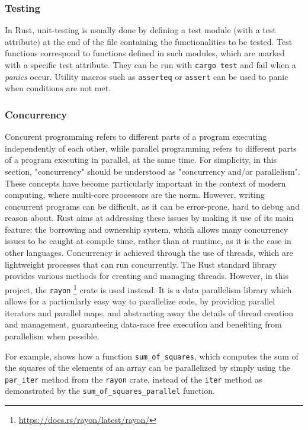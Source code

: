\subsubsection{Testing}

In Rust, unit-testing is usually done by defining a test module (with a test attribute) at the end of the file containing the functionalities to be
tested. Test functions correspond to functions defined in such modules, which are marked with a specific test attribute. They can be run
with \texttt{cargo test} and fail when a \textit{panics} occur.  Utility macros such as \texttt{asserteq} or \texttt{assert} can be used to panic
when conditions are not met.

\subsubsection{Concurrency}

Concurent programming refers to different parts of a program executing independently of each other, while parallel programming refers to different parts
of a program executing in parallel, at the same time. For simplicity, in this section, "concurrency" should be understood as "concurrency and/or parallelism".
These concepts have become particularly important in the context of modern computing, where multi-core processors are the norm. However, writing concurrent
programs can be difficult, as it can be error-prone, hard to debug and reason about. Rust aims at addressing these issues by making it use of its main feature:
the borrowing and ownership system, which allows many concurrency issues to be caught at compile time, rather than at runtime, as it is the case in other languages.
Concurrency is achieved through the use of threads, which are lightweight processes that can run concurrently. The Rust standard library provides
various methods for creating and managing threads. However, in this project, the \texttt{rayon} \footnote{\url{https://docs.rs/rayon/latest/rayon/}}
crate is used instead. It is a data parallelism library which allows for a particularly easy way to parallelize code, by providing parallel iterators and parallel
maps, and abstracting away the details of thread creation and management, guaranteeing data-race free execution and benefiting from parallelism when possible.

For example,  shows how a function \texttt{sum\_of\_squares}, which computes the sum of the squares of the elements of an array
can be parallelized by simply using the \texttt{par\_iter} method from the \texttt{rayon} crate, instead of the \texttt{iter} method as demonstrated
by the \texttt{sum\_of\_squares\_parallel} function.

